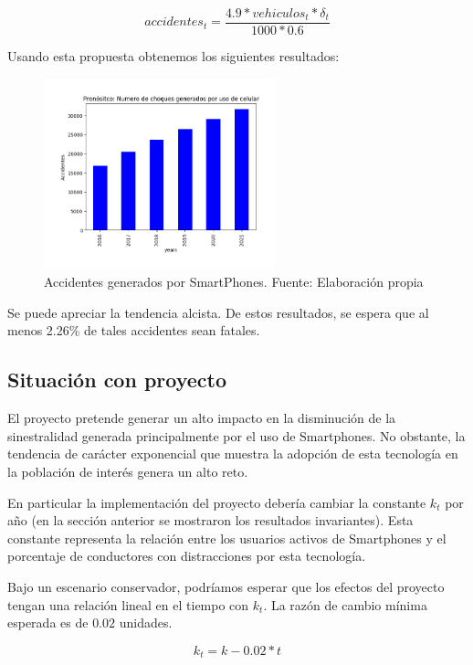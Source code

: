 \documentclass{article}
\begin{document}
\begin{equation}
accidentes_{t} = \frac{4.9 * vehiculos_t * \delta_t}{1000 * 0.6}
\end{equation}

Usando esta propuesta obtenemos los siguientes resultados:

	\begin{figure}[H]\centering
	\includegraphics[width=0.6\textwidth]{resources/img/smart_accidents.png}
	\caption{\label{fig:smart_accidents} Accidentes generados por SmartPhones. Fuente: Elaboración propia}
    \end{figure}

Se puede apreciar la tendencia alcista. De estos resultados, se espera que al menos 2.26\% de tales accidentes sean
fatales.

\subsection{Situación con proyecto}

El proyecto pretende generar un alto impacto en la disminución de la sinestralidad generada principalmente por el uso
de Smartphones. No obstante, la tendencia de carácter exponencial que muestra la adopción de esta tecnología en la
población de interés genera un alto reto.

En particular la implementación del proyecto debería cambiar la constante $k_t$ por año (en la sección anterior
se mostraron los resultados invariantes). Esta constante representa la relación entre los usuarios activos de Smartphones
y el porcentaje de conductores con distracciones por esta tecnología.

Bajo un escenario conservador, podríamos esperar que los efectos del proyecto tengan una relación lineal en el tiempo
con $k_t$. La razón de cambio mínima esperada es de $0.02$ unidades.

\begin{equation}
k_{t} = k - 0.02 * t
\end{equation}
\end{document}
